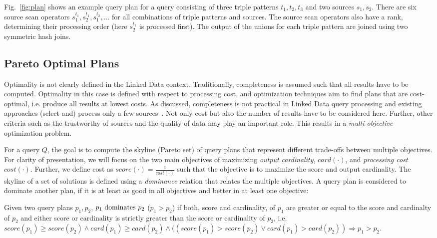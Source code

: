 \begin{example}
  Fig.~\ref{fig:plan} shows an example query plan for a query
  consisting of three triple patterns $t_1,t_2,t_3$ and two 
  sources $s_1,s_2$. There are six source scan operators $s_1^{t_1},
  s_2^{t_1}, s_1^{t_2}, \ldots$ for all combinations of triple
  patterns and sources. The source scan operators also have a rank,
  determining their processing order (here $s_2^{t_1}$ is processed
  first). The output of the unions for each triple pattern are joined
  using two symmetric hash joins. 
\end{example}


\subsection{Pareto Optimal Plans} 
Optimality is not clearly defined in the Linked Data context. Traditionally, completeness is assumed such that all results have to be computed. Optimality in this case is defined with respect to processing cost, and optimization techniques aim to find plans that are cost-optimal, i.e. produce all results at lowest costs. As discussed, completeness is not practical in Linked Data query processing and existing approaches (select and) process only a few sources~\cite{harth_data_2010,ladwig_linked_2010}. Not only cost but also the number of results have to be considered here. Further, other criteria such as the trustworthy of sources and the quality of data may play an important role. This results in a \emph{multi-objective} optimization problem. 

For a query $Q$, %
the goal is to compute the skyline (Pareto set) of query plans that represent different trade-offs between multiple objectives. For clarity of presentation, we will focus on the two main objectives of maximizing \emph{output cardinality}, $card(\cdot)$, and \emph{processing cost} $cost(\cdot)$. Further, we define cost as $score(\cdot) = \frac{1}{cost(\cdot)}$ such that the objective is to maximize the score and output cardinality.  
The skyline of a set of solutions is defined using a \emph{dominance}
relation that relates the multiple objectives. A query plan is considered to dominate another plan, if it is at least as good in all objectives and better in at least one objective:

\begin{definition}[Dominance]
  Given two query plans $p_1,p_2$, $p_1 \mbox{ \textnormal{dominates}
  } p_2$ ($p_1 > p_2$) if both, score and cardinality, of $p_1$ are greater or equal
  to the score and cardinalty of $p_2$ and either score or
  cardinality is strictly greater than the score or cardinality of
  $p_2$, i.e. $score(p_1) \geq score(p_2) \wedge card(p_1) \geq
  card(p_2) \wedge ((score(p_1) > score(p_2) \vee card(p_1) >
  card(p_2)) \Rightarrow p_1 > p_2$.
\end{definition}


